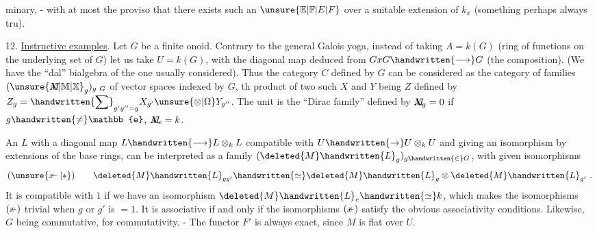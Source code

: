 %
minary, - with at most the proviso that there exists such an $\unsure{\mathbb{E}|\mathbb{F}|E|F}$ over a suitable extension of $k_x$ (something perhaps always tru).

12. \uline{Instructive examples}. Let $G$ be a finite onoid. Contrary to the general Galois yoga, instead of taking $A=k(G)$ (ring of functions on the underlying set of $G$) let us take $U=k(G)$, with the diagonal map deduced from $GxG\handwritten{\longrightarrow}G$ (the composition). (We have the ``dal'' bialgebra  of the one usually considered). Thus the category $C$ defined by $G$  can be considered as the category of families $(\unsure{\rlap{\(M\)}X|\mathbb M|\mathbb X}_g)_{g\ G}$ of vector spaces indexed by $G$, th   product of two such $X$ and $Y$ being $Z$ defined by $Z_g=\handwritten{\displaystyle\sum}_{g'g''=g}X_{g'}\unsure{\otimes|\Omega} Y_{g''}$. The unit is the ``Dirac family'' defined by $\rlap{\(M\)}X_g=0$ if $g\handwritten{\ne}\mathbb{e}$, $\rlap{\(M\)}X_e=k$.

An $L$ with a diagonal map $L\handwritten{\longrightarrow}L\otimes_k L$ compatible with $U\handwritten{\to}U\otimes_k U$ and giving an isomorphism by extensions of the base rings, can be interpreted as a family $(\deleted{M}\handwritten{L}_g)_{g\handwritten{\in}G}$, with given isomorphisms
\[
(\unsure{\rlap{\(x\)}-|*})\qquad \deleted{M}\handwritten{L}_{gg'}\handwritten{\simeq}\deleted{M}\handwritten{L}_g\otimes\deleted{M}\handwritten{L}_{g'}\ .
\]
It is compatible with $1$ if we have an isomorphism\inserted{\handwritten{\unsure{(*+)|(**)}}} $\deleted{M}\handwritten{L}_e\handwritten{\simeq}k$, which makes the isomorphisms $(\rlap{\(x\)}-)$ trivial when  $g$ or $g'$ is $=1$. It is associative if and only if the isomorphisms $(\rlap{\(x\)}-)$ satisfy the  obvious associativity conditions. Likewise, $G$ being commutative, for commutativity. - The functor $F'$ is always exact, since $M$ is flat over $U$.

